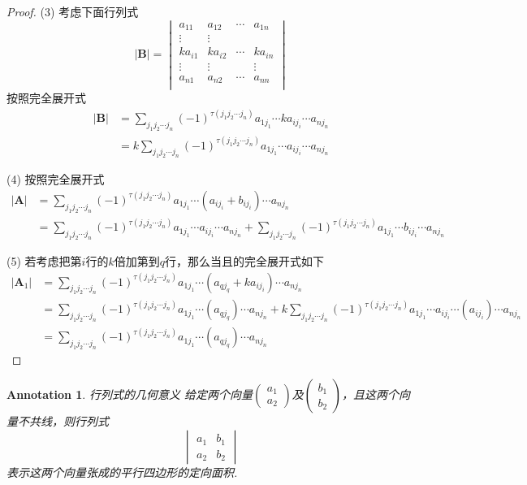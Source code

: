 \documentclass{article}
\newtheorem{annotation}[theorem]{Annotation}
\begin{document}
\begin{proof}
{\color{red}(3)} 考虑下面行列式
$$
|\mathbf{B}|=
\begin{vmatrix}
a_{11} & a_{12} & \cdots & a_{1n} \\
\vdots & \vdots & 		& \\
ka_{i1} & ka_{i2} & \cdots & ka_{in} \\
\vdots & \vdots & 		 & \vdots \\
a_{n1} & a_{n2} & \cdots & a_{nn} \\
\end{vmatrix}
$$
按照完全展开式
$$
\begin{array}{ll}
|\mathbf{B}| &= \sum\limits_{j_1j_2\cdots j_n}(-1)^{\tau(j_1j_2\cdots j_n)} a_{1j_1}\cdots ka_{ij_i} \cdots a_{nj_n}\\
&=  k\sum\limits_{j_1j_2\cdots j_n}(-1)^{\tau(j_1j_2\cdots j_n)} a_{1j_1}\cdots a_{ij_i} \cdots a_{nj_n}
\end{array}
$$

{\color{red}(4)} 按照完全展开式
$$
\begin{array}{ll}
|\mathbf{A}| &= \sum\limits_{j_1j_2\cdots j_n}(-1)^{\tau(j_1j_2\cdots j_n)} a_{1j_1}\cdots (a_{ij_i}+b_{ij_i}) \cdots a_{nj_n}\\
&=  \sum\limits_{j_1j_2\cdots j_n}(-1)^{\tau(j_1j_2\cdots j_n)} a_{1j_1}\cdots a_{ij_i} \cdots a_{nj_n} + \sum\limits_{j_1j_2\cdots j_n}(-1)^{\tau(j_1j_2\cdots j_n)} a_{1j_1}\cdots b_{ij_i} \cdots a_{nj_n}
\end{array}
$$

{\color{red}(5)} 若考虑把第$i$行的$k$倍加第到$q$行，那么当且的完全展开式如下
$$
\begin{array}{ll}
|\mathbf{A}_1| &= \sum\limits_{j_1j_2\cdots j_n}(-1)^{\tau(j_1j_2\cdots j_n)} a_{1j_1}\cdots (a_{qj_q}+ka_{ij_i}) \cdots a_{nj_n}\\
&= \sum\limits_{j_1j_2\cdots j_n}(-1)^{\tau(j_1j_2\cdots j_n)} a_{1j_1}\cdots (a_{qj_q}) \cdots a_{nj_n} + k\sum\limits_{j_1j_2\cdots j_n}(-1)^{\tau(j_1j_2\cdots j_n)} a_{1j_1}\cdots a_{ij_i} \cdots (a_{ij_i}) \cdots a_{nj_n}\\
&= \sum\limits_{j_1j_2\cdots j_n}(-1)^{\tau(j_1j_2\cdots j_n)} a_{1j_1}\cdots (a_{qj_q}) \cdots a_{nj_n}
\end{array}
$$
\end{proof}

\begin{annotation}
\rm {\color{red} 行列式的几何意义} 给定两个向量$\begin{pmatrix}a_1 \\ a_2 \end{pmatrix}$及$\begin{pmatrix}b_1 \\ b_2 \end{pmatrix}$，且这两个向量不共线，则行列式
$$
\begin{vmatrix}
a_1 & b_1 \\
a_2 & b_2
\end{vmatrix}
$$
表示这两个向量张成的平行四边形的定向面积.
\end{annotation}
\end{document}
